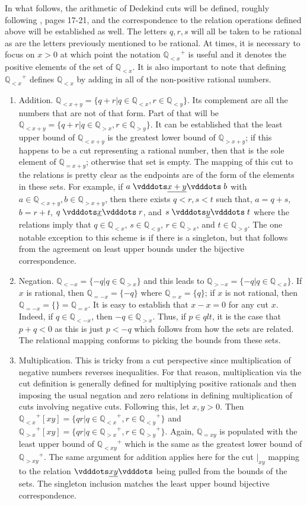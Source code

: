 \documentclass[12pt]{article}
\newcommand{\qcut}[2][x]{\ensuremath{\mathbb{Q}_{#2 #1}}}
\newcommand{\qlt}[1][x]{\qcut[#1]{<}}
\newcommand{\qeq}[1][x]{\qcut[#1]{=}}
\newcommand{\qgt}[1][x]{\qcut[#1]{>}}
\newcommand{\cut}[1][x]{{\vert}_{#1} }
\newcommand{\yrel}{\xrel[y]}
\begin{document}
In what follows, the arithmetic of Dedekind cuts will be defined, roughly following \cite{rudin}, pages 17-21, and the correspondence to the relation operations defined above will be established as well. The letters $q, r, s$ will all be taken to be rational as are the letters previously mentioned to be rational. At times, it is necessary to focus on $x > 0$ at which point the notation $\qlt^+$ is useful and it denotes the positive elements of the set of $\qlt$. It is also important to note that defining $\qlt^+$ defines $\qlt$ by adding in all of the non-positive rational numbers.
 
\begin{enumerate}
    \item Addition. $\qlt[x+y] = \{q + r | q \in \qlt, r \in \qlt[y]\} $. Its complement are all the numbers that are not of that form. Part of that will be $\qlt[x+y] = \{q + r | q \in \qgt, r \in \qgt[y]\}$. It can be established that the least upper bound of $\qlt[x+y]$ is the greatest lower bound of $\qgt[x+y]$; if this happens to be a cut representing a rational number, then that is the sole element of $\qeq[x+y]$; otherwise that set is empty. The mapping of this cut to the relations is pretty clear as the endpoints are of the form of the elements in these sets. For example, if $a \xrel[x+y] b$ with $ a \in \qlt[x+y], b \in \qgt[x+y]$, then there exists $q <r, s < t$ such that, $a = q+s$, $b = r+t$, $q \xrel r$,  and $s \yrel t$ where the relations imply that  $q \in \qlt$, $s \in \qlt[y]$, $r \in \qgt$, and $t \in \qgt[y]$.  The one notable exception to this scheme is if there is a singleton, but that follows from the agreement on least upper bounds under the bijective correspondence. 
    \item Negation. $\qlt[-x] = \{-q | q \in \qgt\}$ and this leads to $\qgt[-x] = \{-q | q \in \qlt\}$. If $x$ is rational, then $\qeq[-x] = \{-q\}$ where $\qeq = \{q\}$; if $x$ is not rational, then $\qeq[-x] = \{\} = \qeq$. It is easy to establish that $x-x = 0$ for any cut $x$. Indeed, if $q \in \qlt[-x]$, then $-q \in \qgt$. Thus, if $p \in qlt$, it is the case that $p+q < 0$ as this is just $p < -q$ which follows from how the sets are related. The relational mapping conforms to picking the bounds from these sets. 
    \item Multiplication. This is tricky from a cut perspective since multiplication of negative numbers reverses inequalities. For that reason, multiplication via the cut definition is generally defined for multiplying positive rationals and then imposing the usual negation and zero relations in defining multiplication of cuts involving negative cuts. Following this, let $x , y > 0$. Then $\qlt^+[xy] = \{qr | q \in \qlt^+, r \in \qlt[y]^+ \}$ and $\qgt^+[xy] = \{qr | q \in \qgt^+,  r \in \qgt[y]^+ \}$. Again, $\qeq[xy]$ is populated with the least upper bound of $\qlt[xy]^+$ which is the same as the greatest lower bound of $\qgt[xy]^+$. The same argument for addition applies here for the cut $\cut[xy]$ mapping to the relation $\xrel[xy]$ being pulled from the bounds of the sets. The singleton inclusion matches the least upper bound bijective correspondence. 

\end{enumerate}
\end{document}
